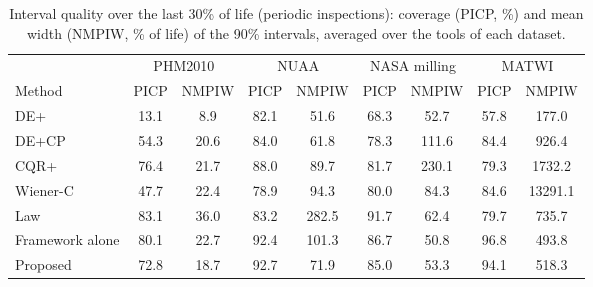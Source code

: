 \begin{table}[!htbp]
\centering
\caption{Interval quality over the last 30\% of life (periodic inspections): coverage (PICP, \%) and mean width (NMPIW, \% of life) of the 90\% intervals, averaged over the tools of each dataset.}
\label{tab:Slate}
\footnotesize\setlength{\tabcolsep}{3pt}
\begin{tabular}{lcccccccc}
\toprule
 & \multicolumn{2}{c}{PHM2010} & \multicolumn{2}{c}{NUAA} & \multicolumn{2}{c}{NASA milling} & \multicolumn{2}{c}{MATWI}\\
\cmidrule(lr){2-3}\cmidrule(lr){4-5}\cmidrule(lr){6-7}\cmidrule(lr){8-9}
Method & PICP & NMPIW & PICP & NMPIW & PICP & NMPIW & PICP & NMPIW\\
\midrule
DE+ & 13.1 & 8.9 & 82.1 & 51.6 & 68.3 & 52.7 & 57.8 & 177.0\\
DE+CP & 54.3 & 20.6 & 84.0 & 61.8 & 78.3 & 111.6 & 84.4 & 926.4\\
CQR+ & 76.4 & 21.7 & 88.0 & 89.7 & 81.7 & 230.1 & 79.3 & 1732.2\\
Wiener-C & 47.7 & 22.4 & 78.9 & 94.3 & 80.0 & 84.3 & 84.6 & 13291.1\\
Law & 83.1 & 36.0 & 83.2 & 282.5 & 91.7 & 62.4 & 79.7 & 735.7\\
Framework alone & 80.1 & 22.7 & 92.4 & 101.3 & 86.7 & 50.8 & 96.8 & 493.8\\
Proposed & 72.8 & 18.7 & 92.7 & 71.9 & 85.0 & 53.3 & 94.1 & 518.3\\
\bottomrule
\end{tabular}
\end{table}
